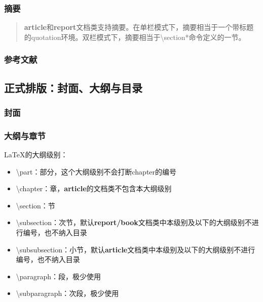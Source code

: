         \subsubsection{摘要}
            \renewcommand{\abstractname}{这是摘要} %
            \begin{abstract}
                \textbf{article}和\textbf{report}文档类支持摘要。在单栏模式下，摘要相当于一个带标题的quotation环境。双栏模式下，摘要相当于\textbackslash section*命令定义的一节。
            \end{abstract}
        
        \subsubsection{参考文献}

    \subsection{正式排版：封面、大纲与目录}
        \subsubsection{封面}
        \subsubsection{大纲与章节}
            \LaTeX 的大纲级别：

            \begin{itemize}
                \item \textbackslash part：部分，这个大纲级别不会打断chapter的编号
                \item \textbackslash chapter：章，\textbf{article}的文档类不包含本大纲级别
                \item \textbackslash section：节
                \item \textbackslash subsection：次节，默认\textbf{report/book}文档类中本级别及以下的大纲级别不进行编号，也不纳入目录
                \item \textbackslash subsubsection：小节，默认\textbf{article}文档类中本级别及以下的大纲级别不进行编号，也不纳入目录
                \item \textbackslash paragraph：段，极少使用
                \item \textbackslash subparagraph：次段，极少使用
            \end{itemize}

